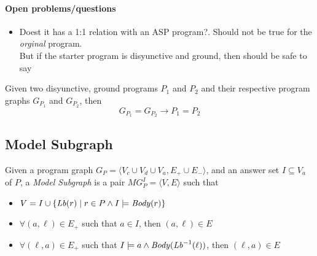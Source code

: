 \paragraph{Open problems/questions}
\begin{itemize}
  \item
  {\color{red} Doest it has a 1:1 relation with an ASP program?}.
  Should not be true for the \emph{orginal} program.
  \\
  But if the starter program is disyunctive and ground, then should be safe to say
\end{itemize}

\begin{proposition}
  Given two disyunctive, ground programs $P_1$ and $P_2$ and their respective program graphs $G_{P_1}$ and $G_{P_2}$, then
  \[ G_{P_1} = G_{P_2} \rightarrow P_1 = P_2 \]
\end{proposition}

\subsection{Model Subgraph}

\begin{definition}
  Given a program graph $G_P = \langle V_c \cup V_d \cup V_a, E_{+} \cup E_{-} \rangle$,
  and an answer set $I \subseteq V_a$ of $P$,
  a \emph{Model Subgraph} is a pair $MG_P^I = \langle V, E \rangle$ such that
  \begin{itemize}
    \item $V = I \cup \{ \mathit{Lb}(r) \mid r \in P \land I \models \mathit{Body}(r) \}$
    \item $\forall (a, \ell) \in E_{+}$ such that $a \in I$, then $(a, \ell) \in E$
    \item $\forall (\ell, a) \in E_{+}$ such that $I \models a \wedge \mathit{Body}(\mathit{Lb}^{-1}(\ell))$, then $(\ell, a) \in E$
  \end{itemize}
\end{definition}

